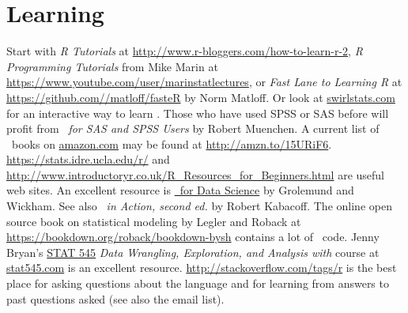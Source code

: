 \section{Learning \R}
Start with \emph{R Tutorials} at \url{http://www.r-bloggers.com/how-to-learn-r-2}, \emph{R Programming Tutorials} from Mike Marin at
\url{https://www.youtube.com/user/marinstatlectures}, or \emph{Fast
  Lane to Learning R} at \url{https://github.com//matloff/fasteR} by
Norm Matloff.  Or look at
\url{swirlstats.com} for an interactive way to learn \R. Those
who have used SPSS or SAS before will profit from \emph{\R\ for SAS
  and SPSS Users} by Robert Muenchen.  A current list of \R\ books on
\href{https://www.amazon.com/}{amazon.com} may be found at \url{http://amzn.to/15URiF6}.
\url{https://stats.idre.ucla.edu/r/} and
\url{http://www.introductoryr.co.uk/R_Resources_for_Beginners.html}
are useful web sites. 
An excellent resource is \href{https://r4ds.had.co.nz/}{\R\ for Data Science} by Grolemund and Wickham.
See also \emph{\R\ in Action, second ed.} by Robert 
Kabacoff.  The online open source book on statistical modeling by Legler and Roback at
\url{https://bookdown.org/roback/bookdown-bysh} contains a lot of \R\ code.
Jenny Bryan's \href{https://stat545.com}{STAT 545} \emph{Data
  Wrangling, Exploration, and Analysis with \R} course at
\url{stat545.com} is an excellent resource.
\url{http://stackoverflow.com/tags/r} is the best place for asking
questions about the language and for learning from answers to past questions
asked (see also the  email list).

